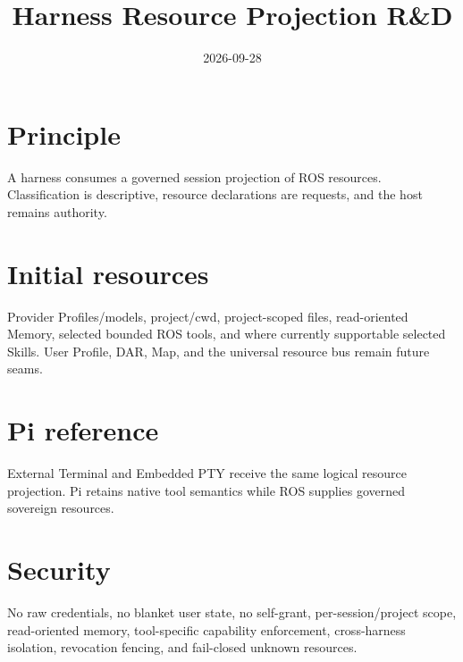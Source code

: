 \documentclass[11pt]{article}
\title{Harness Resource Projection R\&D}\date{2026-09-28}
\begin{document}
\maketitle
\section{Principle}
A harness consumes a governed session projection of ROS resources. Classification is descriptive, resource declarations are requests, and the host remains authority.
\section{Initial resources}
Provider Profiles/models, project/cwd, project-scoped files, read-oriented Memory, selected bounded ROS tools, and where currently supportable selected Skills. User Profile, DAR, Map, and the universal resource bus remain future seams.
\section{Pi reference}
External Terminal and Embedded PTY receive the same logical resource projection. Pi retains native tool semantics while ROS supplies governed sovereign resources.
\section{Security}
No raw credentials, no blanket user state, no self-grant, per-session/project scope, read-oriented memory, tool-specific capability enforcement, cross-harness isolation, revocation fencing, and fail-closed unknown resources.
\end{document}
